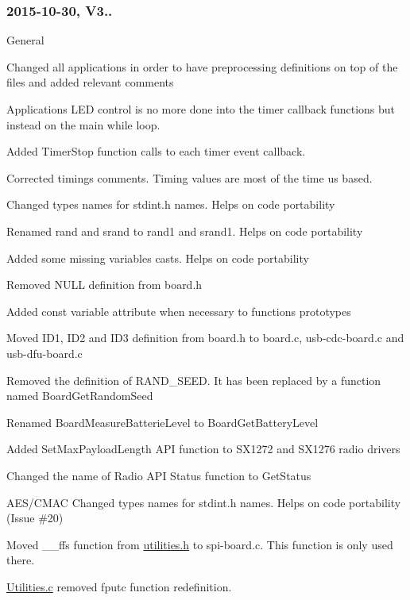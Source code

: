 \subsubsection*{2015-\/10-\/30, V3..}


\begin{DoxyItemize}
\item General
\begin{DoxyEnumerate}
\item Changed all applications in order to have preprocessing definitions on top of the files and added relevant comments
\item Applications L\+ED control is no more done into the timer callback functions but instead on the main while loop.
\item Added Timer\+Stop function calls to each timer event callback.
\item Corrected timings comments. Timing values are most of the time us based.
\item Changed types names for stdint.\+h names. Helps on code portability
\item Renamed rand and srand to rand1 and srand1. Helps on code portability
\item Added some missing variables casts. Helps on code portability
\item Removed N\+U\+LL definition from board.\+h
\item Added const variable attribute when necessary to functions prototypes
\item Moved I\+D1, I\+D2 and I\+D3 definition from board.\+h to board.\+c, usb-\/cdc-\/board.\+c and usb-\/dfu-\/board.\+c
\item Removed the definition of R\+A\+N\+D\+\_\+\+S\+E\+ED. It has been replaced by a function named Board\+Get\+Random\+Seed
\item Renamed Board\+Measure\+Batterie\+Level to Board\+Get\+Battery\+Level
\item Added Set\+Max\+Payload\+Length A\+PI function to S\+X1272 and S\+X1276 radio drivers
\item Changed the name of Radio A\+PI Status function to Get\+Status
\item A\+E\+S/\+C\+M\+AC Changed types names for stdint.\+h names. Helps on code portability (Issue \#20)
\item Moved \+\_\+\+\_\+ffs function from \mbox{\hyperlink{utilities_8h}{utilities.\+h}} to spi-\/board.\+c. This function is only used there.
\item \mbox{\hyperlink{utilities_8c}{Utilities.\+c}} removed fputc function redefinition.

\end{DoxyEnumerate}
\end{DoxyItemize}
